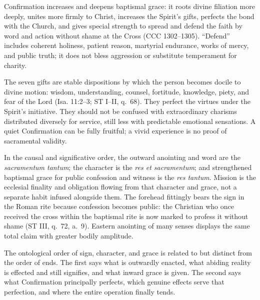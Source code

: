 Confirmation increases and deepens baptismal grace: it roots divine filiation more deeply, unites more firmly to Christ, increases the Spirit's gifts, perfects the bond with the Church, and gives special strength to spread and defend the faith by word and action without shame at the Cross (CCC 1302--1305). ``Defend'' includes coherent holiness, patient reason, martyrial endurance, works of mercy, and public truth; it does not bless aggression or substitute temperament for charity.

The seven gifts are stable dispositions by which the person becomes docile to divine motion: wisdom, understanding, counsel, fortitude, knowledge, piety, and fear of the Lord (Isa. 11:2--3; ST I--II, q.~68). They perfect the virtues under the Spirit's initiative. They should not be confused with extraordinary charisms distributed diversely for service, still less with predictable emotional sensations. A quiet Confirmation can be fully fruitful; a vivid experience is no proof of sacramental validity.

In the causal and significative order, the outward anointing and word are the \emph{sacramentum tantum}; the character is the \emph{res et sacramentum}; and strengthened baptismal grace for public confession and witness is the \emph{res tantum}. Mission is the ecclesial finality and obligation flowing from that character and grace, not a separate habit infused alongside them. The forehead fittingly bears the sign in the Roman rite because confession becomes public: the Christian who once received the cross within the baptismal rite is now marked to profess it without shame (ST III, q.~72, a.~9). Eastern anointing of many senses displays the same total claim with greater bodily amplitude.

The ontological order of sign, character, and grace is related to but distinct from the order of ends. The first says what is outwardly enacted, what abiding reality is effected and still signifies, and what inward grace is given. The second says what Confirmation principally perfects, which genuine effects serve that perfection, and where the entire operation finally tends.

